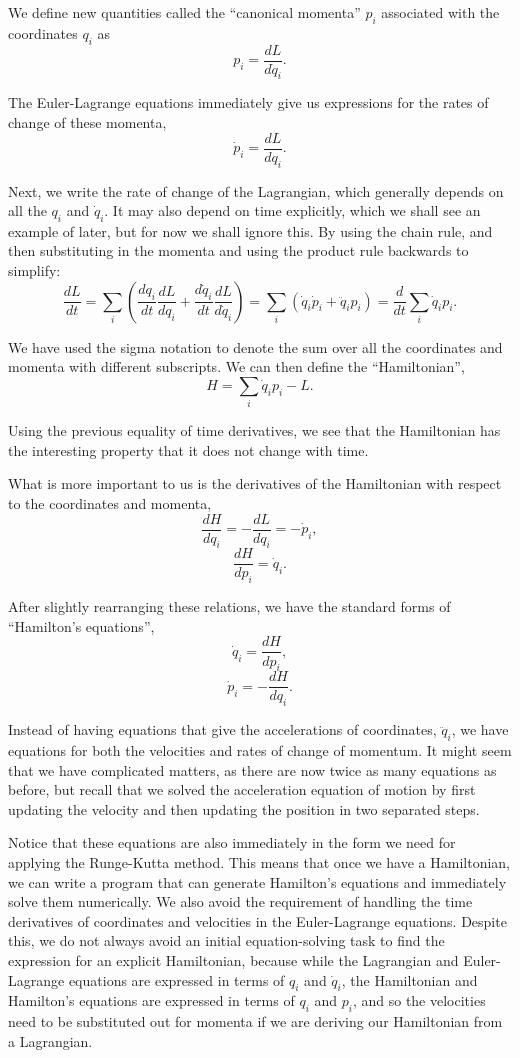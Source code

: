 \documentclass[11pt]{article}
\begin{document}
We define new quantities called the ``canonical momenta'' $p_i$ associated with the coordinates $q_i$ as
$$p_i=\frac{dL}{d\dot{q}_i}.$$

The Euler\hyp{}Lagrange equations immediately give us expressions for the rates of change of these momenta,
$$\dot{p}_i=\frac{dL}{dq_i}.$$

Next, we write the rate of change of the Lagrangian, which generally depends on all the $q_i$ and $\dot{q}_i$. It may also depend on time explicitly, which we shall see an example of later, but for now we shall ignore this. By using the chain rule, and then substituting in the momenta and using the product rule backwards to simplify:
$$\frac{dL}{dt}=\sum_i\left(\frac{dq_i}{dt}\frac{dL}{dq_i}+\frac{d\dot{q}_i}{dt}\frac{dL}{d\dot{q}_i}\right)=\sum_i\left(\dot{q}_i\dot{p}_i+\ddot{q}_ip_i\right)=\frac{d}{dt}\sum_i\dot{q}_ip_i.$$

We have used the sigma notation to denote the sum over all the coordinates and momenta with different subscripts. We can then define the ``Hamiltonian'',
$$H=\sum_i\dot{q}_ip_i-L.$$

Using the previous equality of time derivatives, we see that the Hamiltonian has the interesting property that it does not change with time.
\newpage

What is more important to us is the derivatives of the Hamiltonian with respect to the coordinates and momenta,
$$\frac{dH}{dq_i}=-\frac{dL}{dq_i}=-\dot{p}_i,$$
$$\frac{dH}{dp_i}=\dot{q}_i.$$

After slightly rearranging these relations, we have the standard forms of ``Hamilton's equations'',
$$\dot{q}_i=\frac{dH}{dp_i},$$
$$\dot{p}_i=-\frac{dH}{dq_i}.$$

Instead of having equations that give the accelerations of coordinates, $\ddot{q}_i$, we have equations for both the velocities and rates of change of momentum. It might seem that we have complicated matters, as there are now twice as many equations as before, but recall that we solved the acceleration equation of motion by first updating the velocity and then updating the position in two separated steps.
\newline

Notice that these equations are also immediately in the form we need for applying the Runge\hyp{}Kutta method. This means that once we have a Hamiltonian, we can write a program that can generate Hamilton's equations and immediately solve them numerically. We also avoid the requirement of handling the time derivatives of coordinates and velocities in the Euler\hyp{}Lagrange equations. Despite this, we do not always avoid an initial equation\hyp{}solving task to find the expression for an explicit Hamiltonian, because while the Lagrangian and Euler\hyp{}Lagrange equations are expressed in terms of $q_i$ and $\dot{q}_i$, the Hamiltonian and Hamilton's equations are expressed in terms of $q_i$ and $p_i$, and so the velocities need to be substituted out for momenta if we are deriving our Hamiltonian from a Lagrangian.
\newpage
\end{document}
